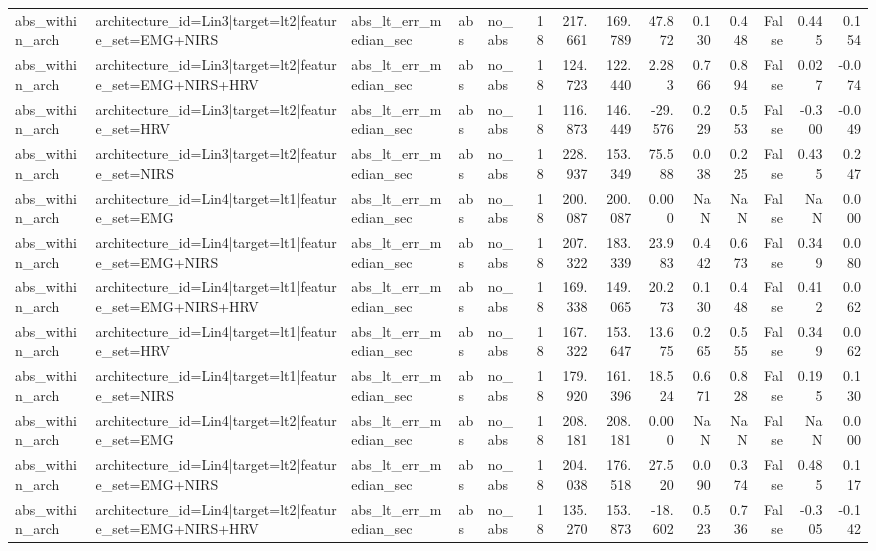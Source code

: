 \begin{table}
\begin{tabular}{lllllrrrrrrrrr}
abs_within_arch & architecture_id=Lin3|target=lt2|feature_set=EMG+NIRS & abs_lt_err_median_sec & abs & no_abs & 18 & 217.661 & 169.789 & 47.872 & 0.130 & 0.448 & False & 0.445 & 0.154 \\
abs_within_arch & architecture_id=Lin3|target=lt2|feature_set=EMG+NIRS+HRV & abs_lt_err_median_sec & abs & no_abs & 18 & 124.723 & 122.440 & 2.283 & 0.766 & 0.894 & False & 0.027 & -0.074 \\
abs_within_arch & architecture_id=Lin3|target=lt2|feature_set=HRV & abs_lt_err_median_sec & abs & no_abs & 18 & 116.873 & 146.449 & -29.576 & 0.229 & 0.553 & False & -0.300 & -0.049 \\
abs_within_arch & architecture_id=Lin3|target=lt2|feature_set=NIRS & abs_lt_err_median_sec & abs & no_abs & 18 & 228.937 & 153.349 & 75.588 & 0.038 & 0.225 & False & 0.435 & 0.247 \\
abs_within_arch & architecture_id=Lin4|target=lt1|feature_set=EMG & abs_lt_err_median_sec & abs & no_abs & 18 & 200.087 & 200.087 & 0.000 & NaN & NaN & False & NaN & 0.000 \\
abs_within_arch & architecture_id=Lin4|target=lt1|feature_set=EMG+NIRS & abs_lt_err_median_sec & abs & no_abs & 18 & 207.322 & 183.339 & 23.983 & 0.442 & 0.673 & False & 0.349 & 0.080 \\
abs_within_arch & architecture_id=Lin4|target=lt1|feature_set=EMG+NIRS+HRV & abs_lt_err_median_sec & abs & no_abs & 18 & 169.338 & 149.065 & 20.273 & 0.130 & 0.448 & False & 0.412 & 0.062 \\
abs_within_arch & architecture_id=Lin4|target=lt1|feature_set=HRV & abs_lt_err_median_sec & abs & no_abs & 18 & 167.322 & 153.647 & 13.675 & 0.265 & 0.555 & False & 0.349 & 0.062 \\
abs_within_arch & architecture_id=Lin4|target=lt1|feature_set=NIRS & abs_lt_err_median_sec & abs & no_abs & 18 & 179.920 & 161.396 & 18.524 & 0.671 & 0.828 & False & 0.195 & 0.130 \\
abs_within_arch & architecture_id=Lin4|target=lt2|feature_set=EMG & abs_lt_err_median_sec & abs & no_abs & 18 & 208.181 & 208.181 & 0.000 & NaN & NaN & False & NaN & 0.000 \\
abs_within_arch & architecture_id=Lin4|target=lt2|feature_set=EMG+NIRS & abs_lt_err_median_sec & abs & no_abs & 18 & 204.038 & 176.518 & 27.520 & 0.090 & 0.374 & False & 0.485 & 0.117 \\
abs_within_arch & architecture_id=Lin4|target=lt2|feature_set=EMG+NIRS+HRV & abs_lt_err_median_sec & abs & no_abs & 18 & 135.270 & 153.873 & -18.602 & 0.523 & 0.736 & False & -0.305 & -0.142 \\

\end{tabular}
\end{table}
